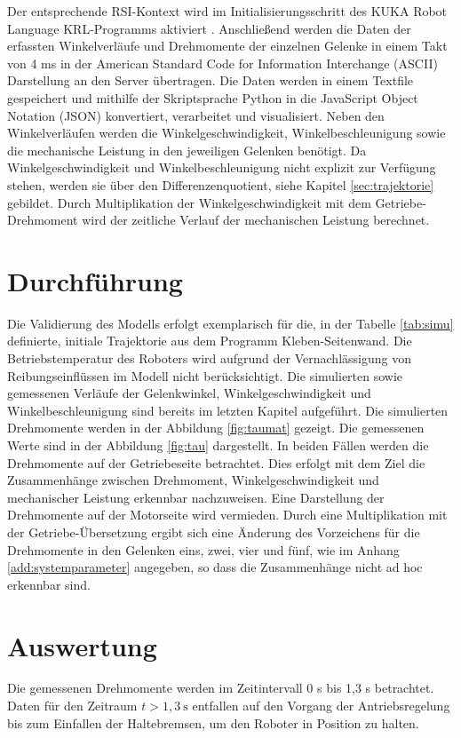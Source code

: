 %
Der entsprechende RSI-Kontext wird im Initialisierungsschritt des KUKA Robot Language KRL-Programms aktiviert \cite[S.~50]{RSI.2020}. Anschließend werden die Daten der erfassten Winkelverläufe und Drehmomente der einzelnen Gelenke in einem Takt von 4 ms in der American Standard Code for Information Interchange (ASCII) Darstellung an den Server übertragen. Die Daten werden in einem Textfile gespeichert und mithilfe der Skriptsprache Python in die JavaScript Object Notation (JSON) konvertiert, verarbeitet und visualisiert. 
%
Neben den Winkelverläufen werden die Winkelgeschwindigkeit, Winkelbeschleunigung sowie die mechanische Leistung in den jeweiligen Gelenken benötigt. Da Winkelgeschwindigkeit und Winkelbeschleunigung nicht explizit zur Verfügung stehen, werden sie über den Differenzenquotient, siehe Kapitel \ref{sec:trajektorie} gebildet. Durch Multiplikation der Winkelgeschwindigkeit mit dem Getriebe-Drehmoment wird der zeitliche Verlauf der mechanischen Leistung berechnet.

\section{Durchführung}
Die Validierung des Modells erfolgt exemplarisch für die, in der Tabelle \ref{tab:simu} definierte, initiale Trajektorie aus dem Programm Kleben-Seitenwand. Die Betriebstemperatur des Roboters wird aufgrund der Vernachlässigung von Reibungseinflüssen im Modell nicht berücksichtigt. Die simulierten sowie gemessenen Verläufe der Gelenkwinkel, Winkelgeschwindigkeit und Winkelbeschleunigung sind bereits im letzten Kapitel aufgeführt. Die simulierten Drehmomente werden in der Abbildung \ref{fig:taumat} gezeigt. Die gemessenen Werte sind in der Abbildung \ref{fig:tau} dargestellt. In beiden Fällen werden die Drehmomente auf der Getriebeseite betrachtet. Dies erfolgt mit dem Ziel die Zusammenhänge zwischen Drehmoment, Winkelgeschwindigkeit und mechanischer Leistung erkennbar nachzuweisen. Eine Darstellung der Drehmomente auf der Motorseite wird vermieden. Durch eine Multiplikation mit der Getriebe-Übersetzung ergibt sich eine Änderung des Vorzeichens für die Drehmomente in den Gelenken eins, zwei, vier und fünf, wie im Anhang \ref{add:systemparameter} angegeben, so dass die Zusammenhänge nicht ad hoc erkennbar sind.

\section{Auswertung}
Die gemessenen Drehmomente werden im Zeitintervall 0 s bis 1,3 s betrachtet. Daten für den Zeitraum $t>1,3~\text{s}$ entfallen auf den Vorgang der Antriebsregelung bis zum Einfallen der Haltebremsen, um den Roboter in Position zu halten. 

